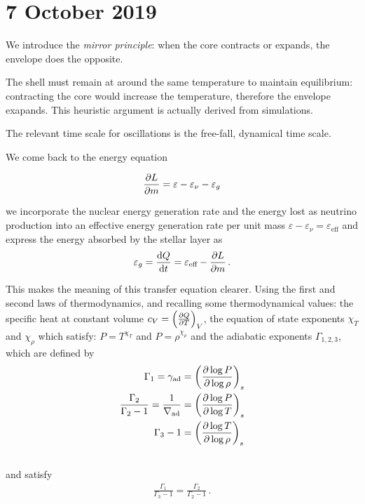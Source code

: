 \documentclass[main.tex]{subfiles}
\begin{document}
\section*{7 October 2019}



We introduce the \emph{mirror principle}: when the core contracts or expands, the envelope does the opposite.

The shell must remain at around the same temperature to maintain equilibrium: contracting the core would increase the temperature, therefore the envelope exapands.
This heuristic argument is actually derived from simulations.

The relevant time scale for oscillations is the free-fall, dynamical time scale.

We come back to the energy equation

\begin{equation}
  \pdv{L}{m} = \varepsilon - \varepsilon_\nu - \varepsilon_g
\end{equation}

we incorporate the nuclear energy generation rate and the energy lost as neutrino production into an effective energy generation rate per unit mass \(\varepsilon - \varepsilon_\nu = \varepsilon_{\text{eff}} \) and express the energy absorbed by the stellar layer as 
%
\begin{align} \label{eq:heat-transfer-effective}
 \varepsilon_g = \dv{Q}{t} = \varepsilon_{\text{eff}} - \pdv{L}{m}
\,.
\end{align}
%

This makes the meaning of this transfer equation clearer.
Using the first and second laws of thermodynamics, and recalling some thermodynamical values: the specific heat at constant volume \(c_V = \qty(\pdv{Q}{T})_V \), the equation of state exponents \(\chi_T \) and \(\chi_\rho
\) which satisfy: \(P = T^{ \chi_{T}}\) and \(P = \rho^{\chi_{\rho }}\) and the adiabatic exponents \(\Gamma_{1,2,3}\), which are defined by 
%
\begin{subequations}
\begin{align}
\Gamma_1 = \gamma_{\text{ad}} &= \qty(\pdv{\log P}{\log \rho })_{s}  \\
\frac{\Gamma_2 }{\Gamma_2 -1} = \frac{1}{\nabla _{\text{ad}}} &= \qty(\pdv{\log P}{\log T})_{s}  \\
\Gamma_3 -1 &= \qty(\pdv{\log T}{\log \rho })_{s}  \\
\,
\end{align}
\end{subequations}
%
and satisfy 
%
\begin{align}
\frac{\Gamma_1 }{\Gamma_3 -1} = \frac{\Gamma_2 }{\Gamma_2 -1}
\,.
\end{align}
\end{document}
